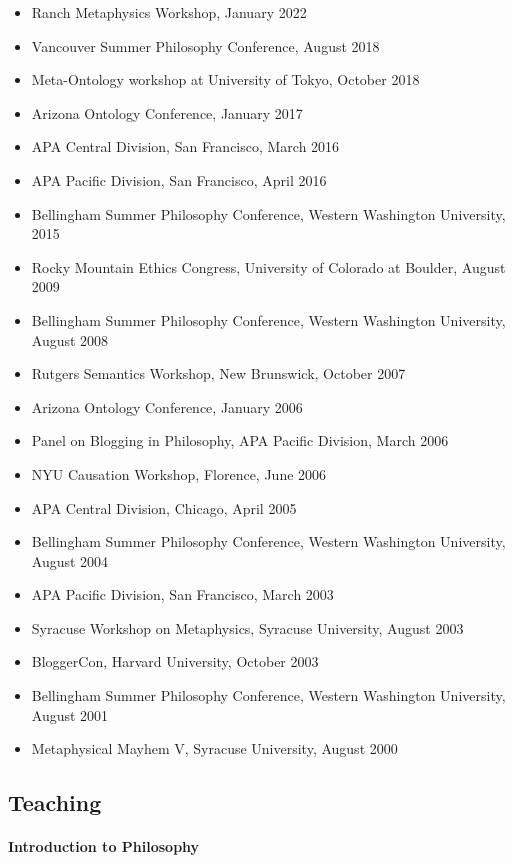 \documentclass[
  10pt,
  letterpaper,
  DIV=11,
  numbers=noendperiod,
  twoside]{scrartcl}
\let\oldparagraph\paragraph
\renewcommand{\paragraph}[1]{\oldparagraph{#1}\mbox{}}
\providecommand{\tightlist}{%
  \setlength{\itemsep}{0pt}\setlength{\parskip}{0pt}}\usepackage{longtable,booktabs,array}
\begin{document}
\begin{itemize}
\tightlist
\item
  Ranch Metaphysics Workshop, January 2022
\item
  Vancouver Summer Philosophy Conference, August 2018
\item
  Meta-Ontology workshop at University of Tokyo, October 2018
\item
  Arizona Ontology Conference, January 2017
\item
  APA Central Division, San Francisco, March 2016
\item
  APA Pacific Division, San Francisco, April 2016
\item
  Bellingham Summer Philosophy Conference, Western Washington
  University, 2015
\item
  Rocky Mountain Ethics Congress, University of Colorado at Boulder,
  August 2009
\item
  Bellingham Summer Philosophy Conference, Western Washington
  University, August 2008
\item
  Rutgers Semantics Workshop, New Brunswick, October 2007
\item
  Arizona Ontology Conference, January 2006
\item
  Panel on Blogging in Philosophy, APA Pacific Division, March 2006
\item
  NYU Causation Workshop, Florence, June 2006
\item
  APA Central Division, Chicago, April 2005
\item
  Bellingham Summer Philosophy Conference, Western Washington
  University, August 2004
\item
  APA Pacific Division, San Francisco, March 2003
\item
  Syracuse Workshop on Metaphysics, Syracuse University, August 2003
\item
  BloggerCon, Harvard University, October 2003
\item
  Bellingham Summer Philosophy Conference, Western Washington
  University, August 2001
\item
  Metaphysical Mayhem V, Syracuse University, August 2000
\end{itemize}

\subsection{Teaching}\label{teaching}

\paragraph{Introduction to Philosophy}\label{introduction-to-philosophy}
\end{document}
